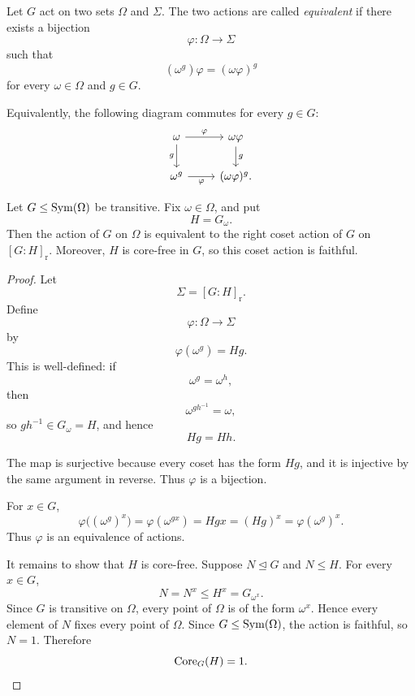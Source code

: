 \begin{definition}
Let \(G\) act on two sets \(\Omega\) and \(\Sigma\). The two actions are called \emph{equivalent} if there exists a bijection
\[
    \varphi:\Omega\longrightarrow \Sigma
\]
such that
\[
    (\omega^g)\varphi=(\omega\varphi)^g
\]
for every \(\omega\in\Omega\) and \(g\in G\).

Equivalently, the following diagram commutes for every \(g\in G\):
\[
\begin{tikzcd}
\omega \arrow[r, "\varphi"] \arrow[d, "{g}"'] &
\omega\varphi \arrow[d, "{g}"] \\
\omega^g \arrow[r, "\varphi"'] &
(\omega\varphi)^g.
\end{tikzcd}
\]
\end{definition}

\begin{theorem}
Let \(G\leq \operatorname{Sym}(\Omega)\) be transitive. Fix \(\omega\in\Omega\), and put
\[
    H=G_\omega.
\]
Then the action of \(G\) on \(\Omega\) is equivalent to the right coset action of \(G\) on \([G:H]_{\mathrm r}\). Moreover, \(H\) is core-free in \(G\), so this coset action is faithful.
\end{theorem}

\begin{proof}
Let
\[
    \Sigma=[G:H]_{\mathrm r}.
\]
Define
\[
    \varphi:\Omega\longrightarrow \Sigma
\]
by
\[
    \varphi(\omega^g)=Hg.
\]
This is well-defined: if
\[
    \omega^g=\omega^h,
\]
then
\[
    \omega^{gh^{-1}}=\omega,
\]
so \(gh^{-1}\in G_\omega=H\), and hence
\[
    Hg=Hh.
\]

The map is surjective because every coset has the form \(Hg\), and it is injective by the same argument in reverse. Thus \(\varphi\) is a bijection.

For \(x\in G\),
\[
    \varphi\bigl((\omega^g)^x\bigr)
    =
    \varphi(\omega^{gx})
    =
    Hgx
    =
    (Hg)^x
    =
    \varphi(\omega^g)^x.
\]
Thus \(\varphi\) is an equivalence of actions.

It remains to show that \(H\) is core-free. Suppose \(N\unlhd G\) and \(N\leq H\). For every \(x\in G\),
\[
    N=N^x\leq H^x=G_{\omega^x}.
\]
Since \(G\) is transitive on \(\Omega\), every point of \(\Omega\) is of the form \(\omega^x\). Hence every element of \(N\) fixes every point of \(\Omega\). Since \(G\leq \operatorname{Sym}(\Omega)\), the action is faithful, so \(N=1\). Therefore
\[
    \operatorname{Core}_G(H)=1.
\]
\end{proof}

